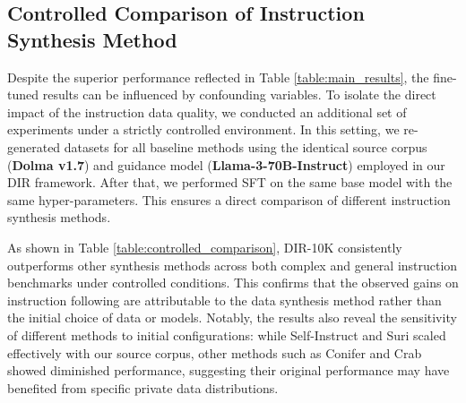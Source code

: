 \subsection{Controlled Comparison of Instruction Synthesis Method}
\label{sec:controlled_comparison}

Despite the superior performance reflected in Table \ref{table:main_results}, the fine-tuned results can be influenced by confounding variables. To isolate the direct impact of the instruction data quality, we conducted an additional set of experiments under a strictly controlled environment. In this setting, we re-generated datasets for all baseline methods using the identical source corpus (\textbf{Dolma v1.7}) and guidance model (\textbf{Llama-3-70B-Instruct}) employed in our DIR framework. After that, we performed SFT on the same base model with the same hyper-parameters. This ensures a direct  comparison of different instruction synthesis methods.

As shown in Table \ref{table:controlled_comparison}, DIR-10K consistently outperforms other synthesis methods across both complex and general instruction benchmarks under controlled conditions. This confirms that the observed gains on instruction following are attributable to the data synthesis method rather than the initial choice of data or models. Notably, the results also reveal the sensitivity of different methods to initial configurations: while Self-Instruct and Suri scaled effectively with our source corpus, other methods such as Conifer and Crab showed diminished performance, suggesting their original performance may have benefited from specific private data distributions.


